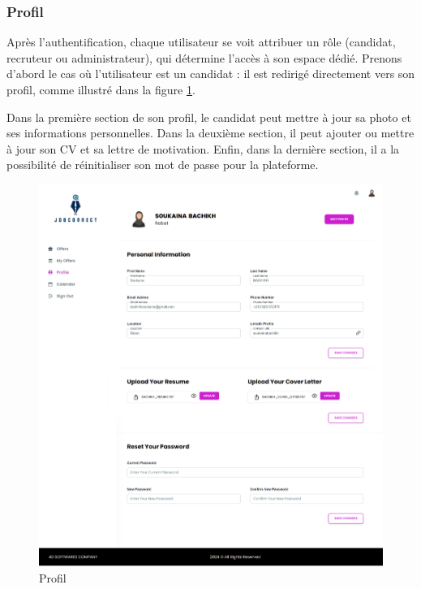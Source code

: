 \subsubsection{Profil}
Après l'authentification, chaque utilisateur se voit attribuer 
un  rôle (candidat, recruteur ou administrateur),  qui  
détermine  l'accès  à son  espace dédié. Prenons d'abord le cas 
où l'utilisateur est un candidat : il est redirigé directement 
vers son profil, comme illustré dans la figure \ref{fig:profile}.
\newline

Dans la première section de son profil, le  candidat peut mettre 
à jour sa photo et ses informations personnelles. Dans la 
deuxième section, il  peut ajouter ou mettre à jour son CV et 
sa lettre  de  motivation.  Enfin,  dans  la  dernière section, 
il a la possibilité de réinitialiser son mot de passe pour la 
plateforme.
\newline


\begin{figure}[htbp]
   \centering
   \includegraphics[scale=0.3]{screens/profile.png} 
   \caption{Profil}
   \label{fig:profile}
\end{figure}


